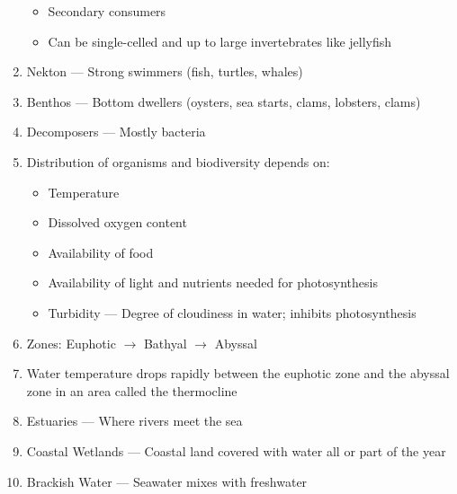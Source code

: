 \documentclass[12pt]{article}
\begin{document}
\begin{enumerate}
    \begin{itemize}

      \item Secondary consumers

      \item Can be single-celled and up to large invertebrates like jellyfish

    \end{itemize}

  \item Nekton — Strong swimmers (fish, turtles, whales)

  \item Benthos — Bottom dwellers (oysters, sea starts, clams, lobsters, clams)

  \item Decomposers — Mostly bacteria

  \item Distribution of organisms and biodiversity depends on:

    \begin{itemize}

      \item Temperature

      \item Dissolved oxygen content

      \item Availability of food

      \item Availability of light and nutrients needed for photosynthesis

      \item Turbidity — Degree of cloudiness in water; inhibits photosynthesis

    \end{itemize}

  \item Zones: Euphotic $\rightarrow$ Bathyal $\rightarrow$ Abyssal

  \item Water temperature drops rapidly between the euphotic zone and the abyssal zone in an area called the thermocline

  \item Estuaries — Where rivers meet the sea

  \item Coastal Wetlands — Coastal land covered with water all or part of the year

  \item Brackish Water — Seawater mixes with freshwater


\end{enumerate}
\end{document}
